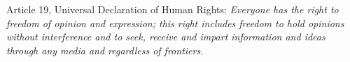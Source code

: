 \begin{displayquote}
Article 19, Universal Declaration of Human Rights\cite{assembly1948universal}: \textit{Everyone has the right to freedom of opinion and expression; this right includes freedom to hold opinions without interference and to seek, receive and impart information and ideas through any media and regardless of frontiers.}
\end{displayquote}
